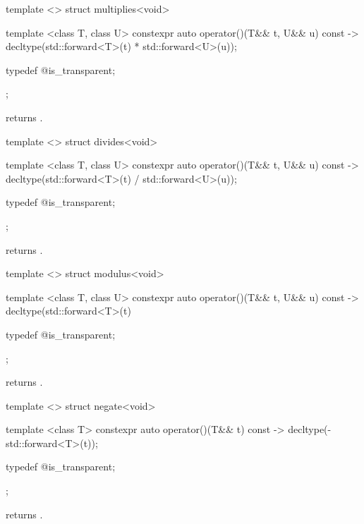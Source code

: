 %
\begin{itemdecl}
template <> struct multiplies<void> {
  template <class T, class U> constexpr auto operator()(T&& t, U&& u) const
    -> decltype(std::forward<T>(t) * std::forward<U>(u));

  typedef @\unspec@ is_transparent;
};
\end{itemdecl}

\begin{itemdescr}
\pnum
{} returns .
\end{itemdescr}

%
\begin{itemdecl}
template <> struct divides<void> {
  template <class T, class U> constexpr auto operator()(T&& t, U&& u) const
    -> decltype(std::forward<T>(t) / std::forward<U>(u));

  typedef @\unspec@ is_transparent;
};
\end{itemdecl}

\begin{itemdescr}
\pnum
{} returns .
\end{itemdescr}

%
\begin{itemdecl}
template <> struct modulus<void> {
  template <class T, class U> constexpr auto operator()(T&& t, U&& u) const
    -> decltype(std::forward<T>(t) %

  typedef @\unspec@ is_transparent;
};
\end{itemdecl}

\begin{itemdescr}
\pnum
{} returns .
\end{itemdescr}

%
\begin{itemdecl}
template <> struct negate<void> {
  template <class T> constexpr auto operator()(T&& t) const
    -> decltype(-std::forward<T>(t));

  typedef @\unspec@ is_transparent;
};
\end{itemdecl}

\begin{itemdescr}
\pnum
{} returns .
\end{itemdescr}


